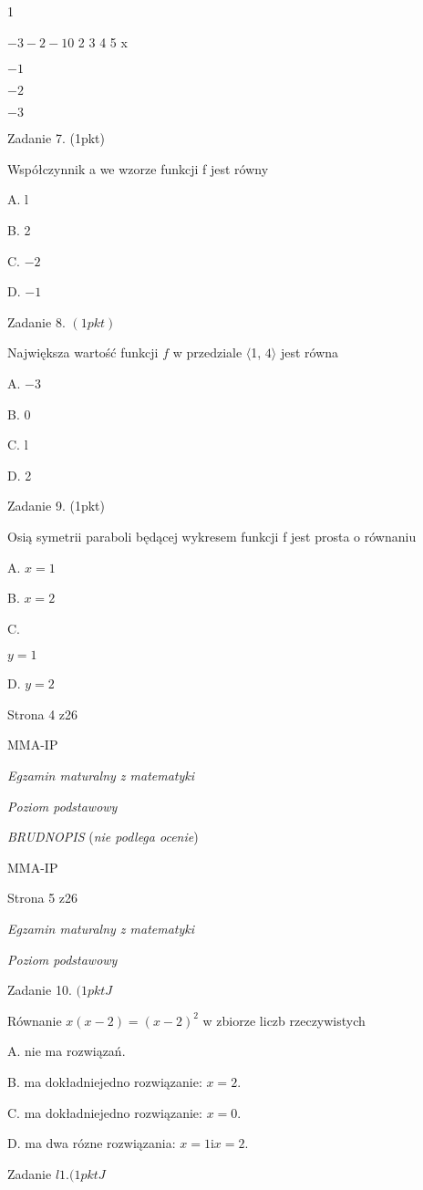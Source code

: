 \documentclass[a4paper,12pt]{article}
\begin{document}
1

$-3  -2 -1 0$  2 3  4 5 x

$-1$

$-2$

$-3$

Zadanie 7. (1pkt)

Współczynnik a we wzorze funkcji f jest równy

A. l

B. 2

C. $-2$

D. $-1$

Zadanie 8. $(1pkt)$

Największa wartość funkcji $f$ w przedziale $\langle$1, $ 4\rangle$ jest równa

A. $-3$

B. 0

C. l

D. 2

Zadanie 9. (1pkt)

Osią symetrii paraboli będącej wykresem funkcji f jest prosta o równaniu

A. $x=1$

B. $x=2$

C.

$y=1$

D. $y=2$

Strona 4 z26

MMA-IP





{\it Egzamin maturalny z matematyki}

{\it Poziom podstawowy}

{\it BRUDNOPIS} ({\it nie podlega ocenie})

MMA-IP

Strona 5 z26





{\it Egzamin maturalny z matematyki}

{\it Poziom podstawowy}

Zadanie 10. $(1pktJ$

Równanie $x(x-2)=(x-2)^{2}$ w zbiorze liczb rzeczywistych

A. nie ma rozwiązań.

B. ma dokładniejedno rozwiązanie: $x=2.$

C. ma dokładniejedno rozwiązanie: $x=0.$

D. ma dwa rózne rozwiązania: $x=1 \mathrm{i}x=2.$

Zadanie $l1. (1pktJ$
\end{document}
